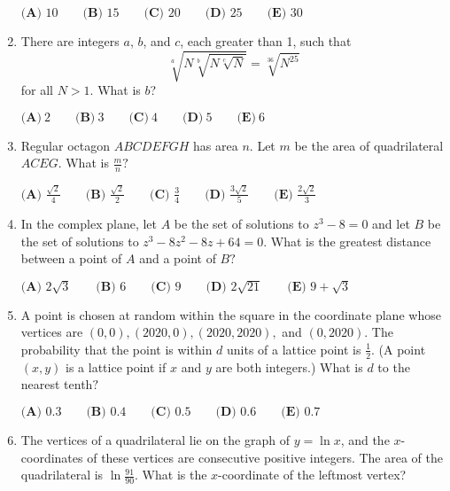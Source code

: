 \documentclass{article}
\begin{document}
\begin{enumerate}[label=\arabic*., itemsep=0.5em]
\(\textbf{(A) } 10 \qquad \textbf{(B) } 15 \qquad \textbf{(C) } 20 \qquad \textbf{(D) } 25 \qquad \textbf{(E) } 30\)\par \vspace{0.5em}\item There are integers \(a\), \(b\), and \(c\), each greater than 1, such that
\begin{equation*}
\sqrt[a]{N \sqrt[b]{N \sqrt[c]{N}}} = \sqrt[36]{N^{25}}
\end{equation*}
for all \(N > 1\). What is \(b\)?

\(\textbf{(A)}\ 2\qquad\textbf{(B)}\ 3\qquad\textbf{(C)}\ 4\qquad\textbf{(D)}\ 5\qquad\textbf{(E)}\ 6\)\par \vspace{0.5em}\item Regular octagon \(ABCDEFGH\) has area \(n\). Let \(m\) be the area of quadrilateral \(ACEG\). What is \(\tfrac{m}{n}?\)

\(\textbf{(A) } \frac{\sqrt{2}}{4} \qquad \textbf{(B) } \frac{\sqrt{2}}{2} \qquad \textbf{(C) } \frac{3}{4} \qquad \textbf{(D) } \frac{3\sqrt{2}}{5} \qquad \textbf{(E) } \frac{2\sqrt{2}}{3}\)\par \vspace{0.5em}\item In the complex plane, let \(A\) be the set of solutions to \(z^3 - 8 = 0\) and let \(B\) be the set of solutions to \(z^3 - 8z^2 - 8z + 64 = 0\). What is the greatest distance between a point of \(A\) and a point of \(B?\)

\(\textbf{(A) } 2\sqrt{3} \qquad \textbf{(B) } 6 \qquad \textbf{(C) } 9 \qquad \textbf{(D) } 2\sqrt{21} \qquad \textbf{(E) } 9 + \sqrt{3}\)\par \vspace{0.5em}\item A point is chosen at random within the square in the coordinate plane whose vertices are \((0, 0), (2020, 0), (2020, 2020),\) and \((0, 2020)\). The probability that the point is within \(d\) units of a lattice point is \(\tfrac{1}{2}\). (A point \((x, y)\) is a lattice point if \(x\) and \(y\) are both integers.) What is \(d\) to the nearest tenth\(?\)

\(\textbf{(A) } 0.3 \qquad \textbf{(B) } 0.4 \qquad \textbf{(C) } 0.5 \qquad \textbf{(D) } 0.6 \qquad \textbf{(E) } 0.7\)\par \vspace{0.5em}\item The vertices of a quadrilateral lie on the graph of \(y = \ln x\), and the \(x\)-coordinates of these vertices are consecutive positive integers. The area of the quadrilateral is \(\ln \frac{91}{90}\). What is the \(x\)-coordinate of the leftmost vertex?


\end{enumerate}
\end{document}
